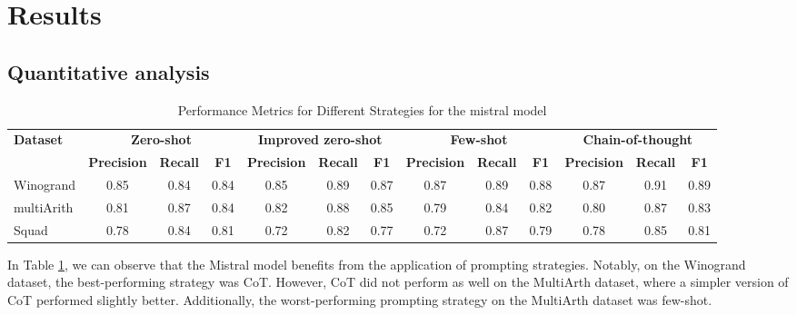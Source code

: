 \documentclass[fleqn,moreauthors,10pt]{ds_report}
\begin{document}
\section*{Results}
\subsection*{Quantitative analysis}

\begin{table}[!htbp]
\centering

\begin{adjustbox}{width=\columnwidth}
\begin{tabular}{@{}lcccccccccccc@{}}
\toprule
\textbf{Dataset} & \multicolumn{3}{c}{\textbf{Zero-shot}} & \multicolumn{3}{c}{\textbf{Improved zero-shot}} & \multicolumn{3}{c}{\textbf{Few-shot}} & \multicolumn{3}{c}{\textbf{Chain-of-thought}} \\
 & \textbf{Precision} & \textbf{Recall} & \textbf{F1} & \textbf{Precision} & \textbf{Recall} & \textbf{F1} & \textbf{Precision} & \textbf{Recall} & \textbf{F1} & \textbf{Precision} & \textbf{Recall} & \textbf{F1} \\ \midrule
Winogrand & 0.85 & 0.84 & 0.84 & 0.85 & 0.89 & 0.87 & 0.87 & 0.89 & 0.88 & 0.87 & 0.91 & 0.89 \\
multiArith & 0.81 &  0.87 & 0.84 & 0.82 & 0.88 & 0.85 & 0.79 & 0.84 & 0.82 & 0.80 & 0.87 & 0.83 \\
Squad & 0.78 &  0.84 & 0.81 & 0.72 & 0.82 & 0.77 & 0.72 & 0.87 & 0.79 & 0.78 & 0.85 & 0.81 \\\bottomrule
\end{tabular}
\end{adjustbox}
\caption{Performance Metrics for Different Strategies for the mistral model}
\label{tab:performance_metrics}
\end{table}

In Table \ref{tab:performance_metrics}, we can observe that the Mistral model benefits from the application of prompting strategies. Notably, on the Winogrand dataset, the best-performing strategy was CoT. However, CoT did not perform as well on the MultiArth dataset, where a simpler version of CoT performed slightly better. Additionally, the worst-performing prompting strategy on the MultiArth dataset was few-shot.
\end{document}
